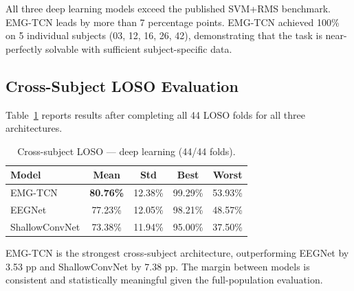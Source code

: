 \documentclass[11pt,twocolumn]{article}
\begin{document}
All three deep learning models exceed the published SVM+RMS benchmark. EMG-TCN
leads by more than 7 percentage points. EMG-TCN achieved 100\% on 5 individual
subjects (03, 12, 16, 26, 42), demonstrating that the task is near-perfectly
solvable with sufficient subject-specific data.

\subsection{Cross-Subject LOSO Evaluation}

Table~\ref{tab:loso} reports results after completing all 44 LOSO folds for all
three architectures.

\begin{table}[h]
\centering
\caption{Cross-subject LOSO — deep learning (44/44 folds).}
\label{tab:loso}
\begin{tabular}{lcccc}
\toprule
\textbf{Model} & \textbf{Mean} & \textbf{Std} & \textbf{Best} & \textbf{Worst} \\
\midrule
EMG-TCN        & \textbf{80.76\%} & 12.38\% & 99.29\% & 53.93\% \\
EEGNet         & 77.23\%          & 12.05\% & 98.21\% & 48.57\% \\
ShallowConvNet & 73.38\%          & 11.94\% & 95.00\% & 37.50\% \\
\bottomrule
\end{tabular}
\end{table}

EMG-TCN is the strongest cross-subject architecture, outperforming EEGNet by
3.53 pp and ShallowConvNet by 7.38 pp. The margin between models is consistent
and statistically meaningful given the full-population evaluation.
\end{document}
